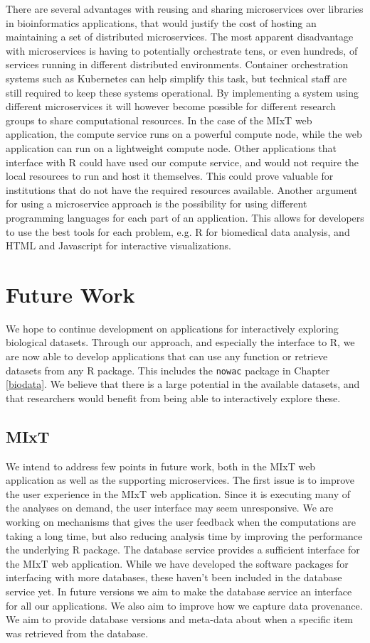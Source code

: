 There are several advantages with reusing and sharing microservices over
libraries in bioinformatics applications, that would justify the cost of hosting
an maintaining a set of distributed microservices.
The most apparent disadvantage with microservices is having to
potentially orchestrate tens, or even hundreds, of services running in different
distributed environments. 
Container orchestration systems such as Kubernetes can help simplify this task,
but technical staff are still required to keep these systems operational. By
implementing a system using different microservices it will however become
possible for different research groups to share computational resources. In the
case of the MIxT web application, the compute service runs on a powerful compute
node, while the web application can run on a lightweight compute node. Other
applications that interface with R could have used our compute service, and would
not require the local resources to run and host it themselves. This could prove
valuable for institutions that do not have the required resources available.
Another argument for using a microservice approach is the possibility for using
different programming languages for each part of an application. This allows for
developers to use the best tools for each problem, e.g. R for biomedical data
analysis, and HTML and Javascript for interactive visualizations. 

\section{Future Work} 
We hope to continue development on applications for interactively exploring
biological datasets. Through our approach, and especially the interface to R, 
we are now able to develop applications that can use any function or retrieve
datasets from any R package. This includes the \texttt{nowac} package in
Chapter \ref{biodata}. We believe that there is a large potential in the
available datasets, and that researchers would benefit from being able to
interactively explore these. 

\subsection{MIxT} 
We intend to address few points in future work, both in the
MIxT web application as well as the supporting microservices.  The first issue
is to improve the user experience in the MIxT web application.  Since it is
executing many of the analyses on demand, the user interface may seem
unresponsive. We are working on mechanisms that gives the user feedback when the
computations are taking a long time, but also reducing analysis time by
improving the performance the underlying R package. The database service
provides a sufficient interface for the MIxT web application. While we have
developed the software packages for interfacing with more databases, these
haven't been included in the database service yet. In future versions we aim to
make the database service an interface for all our applications.  We also aim to
improve how we capture data provenance. We aim to provide database versions and
meta-data about when a specific item was retrieved from the database. 

